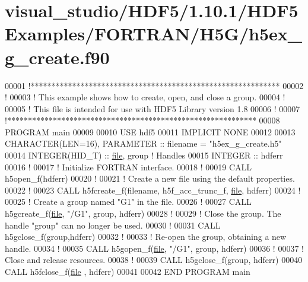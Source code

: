 \hypertarget{visual__studio_2_h_d_f5_21_810_81_2_h_d_f5_examples_2_f_o_r_t_r_a_n_2_h5_g_2h5ex__g__create_8f90_source}{}\section{visual\+\_\+studio/\+H\+D\+F5/1.10.1/\+H\+D\+F5\+Examples/\+F\+O\+R\+T\+R\+A\+N/\+H5\+G/h5ex\+\_\+g\+\_\+create.f90}
\label{visual__studio_2_h_d_f5_21_810_81_2_h_d_f5_examples_2_f_o_r_t_r_a_n_2_h5_g_2h5ex__g__create_8f90_source}

\begin{DoxyCode}
00001 \textcolor{comment}{!************************************************************}
00002 \textcolor{comment}{!}
00003 \textcolor{comment}{!  This example shows how to create, open, and close a group.}
00004 \textcolor{comment}{!}
00005 \textcolor{comment}{!  This file is intended for use with HDF5 Library version 1.8}
00006 \textcolor{comment}{!}
00007 \textcolor{comment}{!************************************************************}
00008 \textcolor{keyword}{PROGRAM} main
00009 
00010   \textcolor{keywordtype}{USE }hdf5
00011   \textcolor{keywordtype}{IMPLICIT NONE}
00012 
00013   \textcolor{keywordtype}{CHARACTER(LEN=16)}, \textcolor{keywordtype}{PARAMETER} :: filename   = \textcolor{stringliteral}{"h5ex\_g\_create.h5"}
00014   \textcolor{keywordtype}{INTEGER(HID\_T)} :: \hyperlink{structfile}{file}, group \textcolor{comment}{! Handles}
00015   \textcolor{keywordtype}{INTEGER} :: hdferr
00016   \textcolor{comment}{!}
00017   \textcolor{comment}{! Initialize FORTRAN interface.}
00018   \textcolor{comment}{!}
00019   \textcolor{keyword}{CALL }h5open\_f(hdferr)
00020   \textcolor{comment}{!}
00021   \textcolor{comment}{! Create a new file using the default properties.}
00022   \textcolor{comment}{!}
00023   \textcolor{keyword}{CALL }h5fcreate\_f(filename, h5f\_acc\_trunc\_f, \hyperlink{structfile}{file}, hdferr)
00024   \textcolor{comment}{!}
00025   \textcolor{comment}{! Create a group named "G1" in the file.}
00026   \textcolor{comment}{!}
00027   \textcolor{keyword}{CALL }h5gcreate\_f(\hyperlink{structfile}{file}, \textcolor{stringliteral}{"/G1"}, group, hdferr)
00028   \textcolor{comment}{!}
00029   \textcolor{comment}{! Close the group.  The handle "group" can no longer be used.}
00030   \textcolor{comment}{!}
00031   \textcolor{keyword}{CALL }h5gclose\_f(group,hdferr)
00032   \textcolor{comment}{!}
00033   \textcolor{comment}{! Re-open the group, obtaining a new handle.}
00034   \textcolor{comment}{!}
00035   \textcolor{keyword}{CALL }h5gopen\_f(\hyperlink{structfile}{file}, \textcolor{stringliteral}{"/G1"}, group, hdferr)
00036   \textcolor{comment}{!}
00037   \textcolor{comment}{! Close and release resources.}
00038   \textcolor{comment}{!}
00039   \textcolor{keyword}{CALL }h5gclose\_f(group, hdferr)
00040   \textcolor{keyword}{CALL }h5fclose\_f(\hyperlink{structfile}{file} , hdferr)
00041 
00042 \textcolor{keyword}{END PROGRAM }main
\end{DoxyCode}
